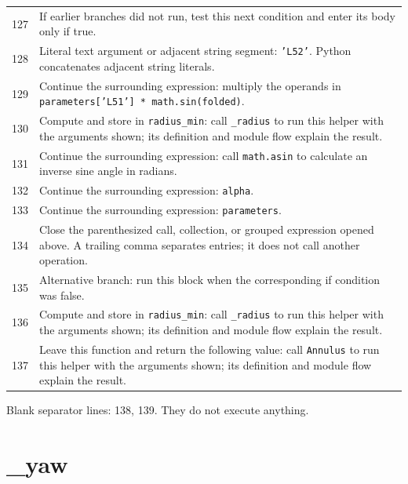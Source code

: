 \documentclass[11pt,a4paper]{book}
\begin{document}
\begin{longtable}{r p{}}
127 & If earlier branches did not run, test this next condition and enter its body only if true. \\

128 & Literal text argument or adjacent string segment: \texttt{'L52'}. Python concatenates adjacent string literals. \\

129 & Continue the surrounding expression: multiply the operands in \texttt{parameters['L51'] * math.sin(folded)}. \\

130 & Compute and store in \texttt{radius\_min}: call \texttt{\_radius} to run this helper with the arguments shown; its definition and module flow explain the result.  \\

131 & Continue the surrounding expression: call \texttt{math.asin} to calculate an inverse sine angle in radians. \\

132 & Continue the surrounding expression: \texttt{alpha}. \\

133 & Continue the surrounding expression: \texttt{parameters}. \\

134 & Close the parenthesized call, collection, or grouped expression opened above. A trailing comma separates entries; it does not call another operation. \\

135 & Alternative branch: run this block when the corresponding if condition was false. \\

136 & Compute and store in \texttt{radius\_min}: call \texttt{\_radius} to run this helper with the arguments shown; its definition and module flow explain the result.  \\

137 & Leave this function and return the following value: call \texttt{Annulus} to run this helper with the arguments shown; its definition and module flow explain the result. \\

\end{longtable}

Blank separator lines: 138, 139. They do not execute anything.

\section{\_yaw}
\end{document}
